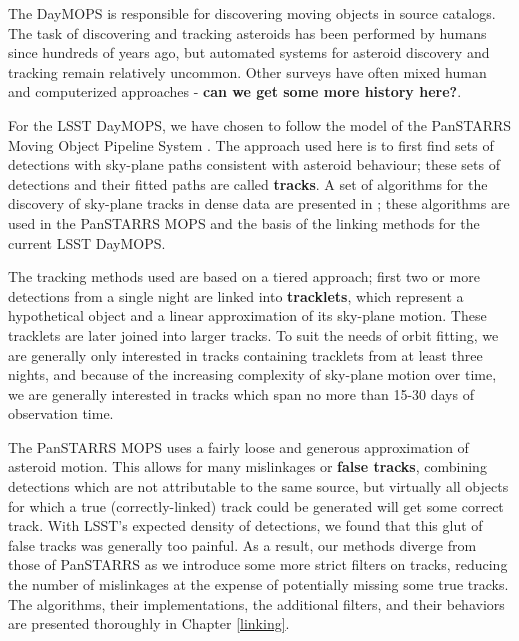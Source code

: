 

The DayMOPS is responsible for discovering moving objects in source
catalogs.  The task of discovering and tracking asteroids has been
performed by humans since hundreds of years ago, but automated systems
for asteroid discovery and tracking remain relatively uncommon.  Other
surveys have often mixed human and computerized approaches -
\textbf{can we get some more history here?}.


For the LSST DayMOPS, we have chosen to follow the model of the
PanSTARRS Moving Object Pipeline System \citep{psMOPSDesign}.  The
approach used here is to first find sets of detections with sky-plane
paths consistent with asteroid behaviour; these sets of detections and
their fitted paths are called \textbf{tracks}.  A set of algorithms
for the discovery of sky-plane tracks in dense data are presented in
\citet{Kubica:2005:MTA:1081870.1081889}; these algorithms are used in
the PanSTARRS MOPS and the basis of the linking methods for the
current LSST DayMOPS.  



The tracking methods used are based on a tiered approach; first two or
more detections from a single night are linked into
\textbf{tracklets}, which represent a hypothetical object and a linear
approximation of its sky-plane motion.  These tracklets are later
joined into larger tracks.  To suit the needs of orbit fitting, we are
generally only interested in tracks containing tracklets from at least
three nights, and because of the increasing complexity of sky-plane
motion over time, we are generally interested in tracks which span no
more than 15-30 days of observation time.

The PanSTARRS MOPS uses a fairly loose and generous approximation of
asteroid motion.  This allows for many mislinkages or \textbf{false
  tracks}, combining detections which are not attributable to the same
source, but virtually all objects for which a true (correctly-linked)
track could be generated will get some correct track.  With LSST's
expected density of detections, we found that this glut of false
tracks was generally too painful.  As a result, our methods diverge
from those of PanSTARRS as we introduce some more strict filters on
tracks, reducing the number of mislinkages at the expense of
potentially missing some true tracks.  The algorithms, their
implementations, the additional filters, and their behaviors are
presented thoroughly in Chapter \ref{linking}.

